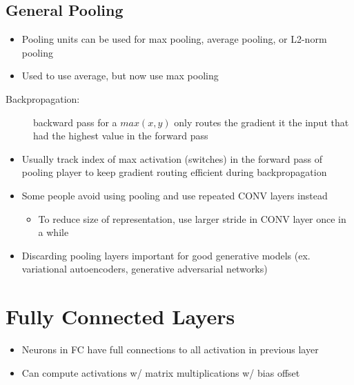 \documentclass[a4paper,12pt]{article}
\begin{document}
\subsection{General Pooling}
\begin{itemize}
  \item Pooling units can be used for max pooling, average pooling, or L2-norm pooling
  \item Used to use average, but now use max pooling
\end{itemize}

\begin{description}
  \item[Backpropagation:] backward pass for a $max(x, y)$ only routes the gradient it the input that had the highest value in the forward  pass
\end{description}
\begin{itemize}
  \item Usually track index of max activation (switches) in the forward pass of pooling player to keep gradient routing efficient during backpropagation
  \item Some people avoid using pooling and use repeated CONV layers instead
  \begin{itemize}
    \item To reduce size of representation, use larger stride in CONV layer once in a while
  \end{itemize}
  \item Discarding pooling layers important for good generative models (ex. variational autoencoders, generative adversarial networks)
\end{itemize}

\section{Fully Connected Layers}
\begin{itemize}
  \item Neurons in FC have full connections to all activation in previous layer
  \item Can compute activations w/ matrix multiplications w/ bias offset
\end{itemize}
\end{document}
